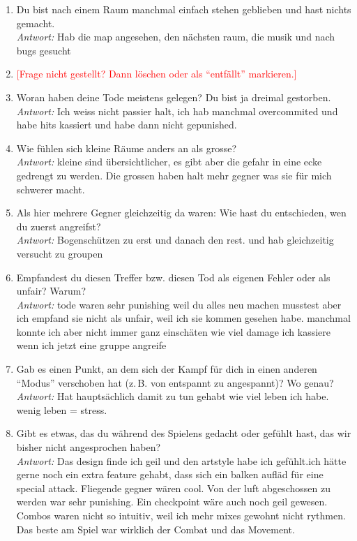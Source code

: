 \documentclass[../Main.tex]{subfiles}
\begin{document}
\begin{enumerate}[label=\textbf{I\arabic*}, leftmargin=1.5cm, itemsep=1em]
\item Du bist nach einem Raum manchmal einfach stehen geblieben und hast nichts gemacht. \\
\textit{Antwort:} Hab die map angesehen, den nächsten raum, die musik und nach bugs gesucht

\item \textcolor{red}{[Frage nicht gestellt? Dann löschen oder als \enquote{entfällt} markieren.]}

\item Woran haben deine Tode meistens gelegen? Du bist ja dreimal gestorben. \\
\textit{Antwort:} Ich weiss nicht passier halt, ich hab manchmal overcommited und habe hits kassiert und habe dann nicht gepunished.

\item Wie fühlen sich kleine Räume anders an als grosse? \\
\textit{Antwort:} kleine sind übersichtlicher, es gibt aber die gefahr in eine ecke gedrengt zu werden. Die grossen haben halt mehr gegner was sie für mich schwerer macht.

\item Als hier mehrere Gegner gleichzeitig da waren: Wie hast du entschieden, wen du zuerst angreifst? \\
\textit{Antwort:} Bogenschützen zu erst und danach den rest. und hab gleichzeitig versucht zu groupen

\item Empfandest du diesen Treffer bzw. diesen Tod als eigenen Fehler oder als unfair? Warum? \\
\textit{Antwort:} tode waren sehr punishing weil du alles neu machen musstest aber ich empfand sie nicht als unfair, weil ich sie kommen gesehen habe. manchmal konnte ich aber nicht immer ganz einschäten wie viel damage ich kassiere wenn ich jetzt eine gruppe angreife

\item Gab es einen Punkt, an dem sich der Kampf für dich in einen anderen \enquote{Modus} verschoben hat (z.\,B. von entspannt zu angespannt)? Wo genau? \\
\textit{Antwort:} Hat hauptsächlich damit zu tun gehabt wie viel leben ich habe. wenig leben = stress.

\item Gibt es etwas, das du während des Spielens gedacht oder gefühlt hast, das wir bisher nicht angesprochen haben? \\
\textit{Antwort:} Das design finde ich geil und den artstyle habe ich gefühlt.ich hätte gerne noch ein extra feature gehabt, dass sich ein balken aufläd für eine special attack. Fliegende gegner wären cool. Von der luft abgeschossen zu werden war sehr punishing. Ein checkpoint wäre auch noch geil gewesen. Combos waren nicht so intuitiv, weil ich mehr mixes gewohnt nicht rythmen. Das beste am Spiel war wirklich der Combat und das Movement.
\end{enumerate}
\end{document}
